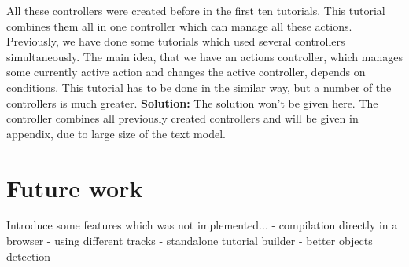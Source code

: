 All these controllers were created before in the first ten tutorials. This tutorial combines them all in one controller which can manage all these actions. Previously, we have done some tutorials which used several controllers simultaneously. The main idea, that we have an actions controller, which manages some currently active action and changes the active controller, depends on conditions. This tutorial has to be done in the similar way, but a number of the controllers is much greater. \newline \newline
\textbf{Solution:} \newline \newline
The solution won't be given here. The controller combines all previously created controllers and will be given in appendix, due to large size of the text model.

\chapter{Future work}
Introduce some features which was not implemented... \newline
- compilation directly in a browser \newline
- using different tracks \newline
- standalone tutorial builder \newline
- better objects detection \newline